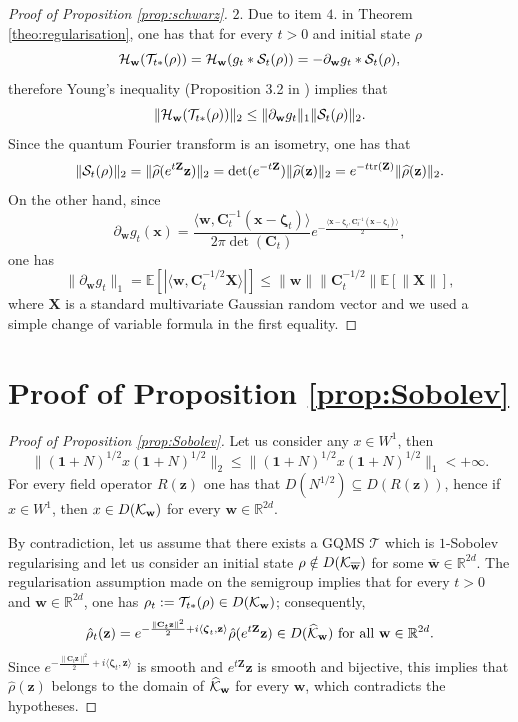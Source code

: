 \documentclass[preprint]{elsarticle}
\theoremstyle{definition}
\def\RR{\mathbb{R}}
\def\TT{\mathcal{T}}
\def\tr{{\rm tr}}
\begin{document}
\begin{proof}[Proof of Proposition \ref{prop:schwarz}]
\bigskip $2.$ Due to item $4.$ in Theorem \ref{theo:regularisation}, one has that for every $t >0$ and initial state $\rho$
$${\cal H}_\mathbf{w}(\TT_{t*}(\rho))={\cal H}_\mathbf{w}(g_t*{\cal S}_t(\rho))=-\partial_{\mathbf{w}}g_t*{\cal S}_t(\rho),$$
therefore Young's inequality (Proposition 3.2 in \cite{We84}) implies that
$$\|{\cal H}_\mathbf{w}(\TT_{t*}(\rho))\|_2 \leq \|\partial_{\mathbf{w}}g_t\|_1\|{\cal S}_t(\rho)\|_2.$$
Since the quantum Fourier transform is an isometry, one has that
$$\|{\cal S}_t(\rho)\|_2=\|\widehat{\rho}(e^{t\mathbf{Z}}\mathbf{z})\|_2 =\det(e^{-t\mathbf{Z}})\|\widehat{\rho}(\mathbf{z})\|_2=e^{-t\tr(\mathbf{Z})}\|\widehat{\rho}(\mathbf{z})\|_2.$$
On the other hand, since
$$\partial_{\mathbf{w}}g_t(\mathbf{x})=\frac{\langle \mathbf{w}, \mathbf{C}^{-1}_t(\mathbf{x}-\boldsymbol{\zeta}_t)\rangle}{2\pi \det(\mathbf{C}_t)}e^{-\frac{\langle \mathbf{x}-\boldsymbol{\zeta}_t,\mathbf{C}_t^{-1}(\mathbf{x}-\boldsymbol{\zeta}_t)\rangle}{2}},$$
one has
$$\|\partial_{\mathbf{w}}g_t\|_1=\mathbb{E}[|\langle \mathbf{w},\mathbf{C}_t^{-1/2}\mathbf{X}\rangle|] \leq \|\mathbf{w}\|\|\mathbf{C}_t^{-1/2}\|\mathbb{E}[\|\mathbf{X}\|],$$
where $\mathbf{X}$ is a standard multivariate Gaussian random vector and we used a simple change of variable formula in the first equality.
\end{proof}

\section{Proof of Proposition \ref{prop:Sobolev}} \label{app:Sobo}

\begin{proof}[Proof of Proposition \ref{prop:Sobolev}] Let us consider any $x \in W^{1}$, then
$$\|(\mathbf{1}+N)^{1/2}x(\mathbf{1}+N)^{1/2}\|_2 \leq \|(\mathbf{1}+N)^{1/2}x(\mathbf{1}+N)^{1/2}\|_1<+\infty.$$
For every field operator $R(\mathbf{z})$ one has that $D(N^{1/2}) \subseteq D(R(\mathbf{z}))$, hence if $x \in W^{1}$, then $x \in D({\cal K}_{\mathbf{w}})$ for every $\mathbf{w} \in \RR^{2d}$.


By contradiction, let us assume that there exists a GQMS $\TT$ which is $1$-Sobolev regularising and let us consider an initial state $\rho \notin D({\cal K}_{\overline{\mathbf{w}}})$ for some $\overline{\mathbf{w}} \in \RR^{2d}$. The regularisation assumption made on the semigroup implies that for every $t>0$ and $\mathbf{w} \in \RR^{2d}$, one has $\rho_t:=\TT_{t*}(\rho) \in D({\cal K}_{\mathbf{w}})$; consequently,
$$\hat{\rho}_t(\mathbf{z})=e^{-\frac{\|\mathbf{C}_t\mathbf{z}\|^2}{2}+i\langle\boldsymbol{\zeta}_t, \mathbf{z}\rangle}\hat{\rho}(e^{t\mathbf{Z}}\mathbf{z}) \in D(\widehat{\cal K}_{\mathbf{w}}) \text{ for all } \mathbf{w} \in \RR^{2d}.$$
Since $e^{-\frac{\|\mathbf{C}_t\mathbf{z}\|^2}{2}+i\langle\boldsymbol{\zeta}_t, \mathbf{z}\rangle}$ is smooth and $e^{t\mathbf{Z}}\mathbf{z}$ is smooth and bijective, this implies that $\hat{\rho}(\mathbf{z})$ belongs to the domain of $\widehat{{\cal K}}_{\mathbf{w}}$ for every $\mathbf{w}$, which contradicts the hypotheses.
\end{proof}
\end{document}
